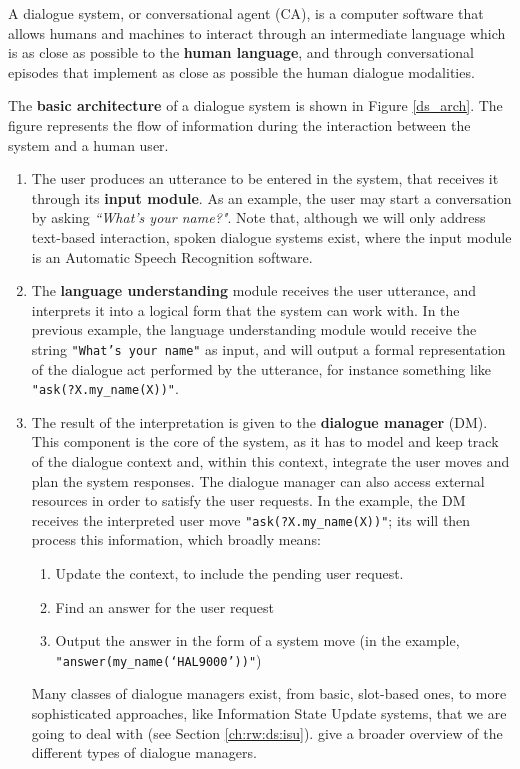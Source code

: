 A dialogue system, or conversational agent (CA), is a computer software that allows humans and machines to interact through an intermediate language which is as close as possible to the \textbf{human language}, and through conversational episodes that implement as close as possible the human dialogue modalities.

The \textbf{basic architecture} of a dialogue system is shown in Figure \ref{ds_arch}. The figure represents the flow of information during the interaction between the system and a human user.

 \begin{enumerate}
	\item The user produces an utterance to be entered in the system, that receives it through its \textbf{input module}. As an example, the user may start a conversation by asking \textit{``What's your name?"}. Note that, although we will only address text-based interaction, spoken dialogue systems exist, where the input module is an Automatic Speech Recognition software.
	\item The \textbf{language understanding} module receives the user utterance, and interprets it into a logical form that the system can work with. In the previous example, the language understanding module would receive the string \texttt{"What's your name"} as input, and will output a formal representation of the dialogue act performed by the utterance, for instance something like \texttt{"ask(?X.my\_name(X))"}.
	\item The result of the interpretation is given to the \textbf{dialogue manager} (DM). This component is the core of the system, as it has to model and keep track of the dialogue context and, within this context, integrate the user moves and plan the system responses. The dialogue manager can also access external resources in order to satisfy the user requests. In the example, the DM receives the interpreted user move \texttt{"ask(?X.my\_name(X))"}; its will then process this information, which broadly means:
	\begin{enumerate}
		\item Update the context, to include the pending user request.
		\item Find an answer for the user request
		\item Output the answer in the form of a system move (in the example, \\ \texttt{"answer(my\_name(`HAL9000'))"})
	\end{enumerate}
	Many classes of dialogue managers exist, from basic, slot-based ones, to more sophisticated approaches, like Information State Update systems, that we are going to deal with (see Section \ref{ch:rw:ds:isu}). \cite{Jokinen2009} give a broader overview of the different types of dialogue managers.

\end{enumerate}
